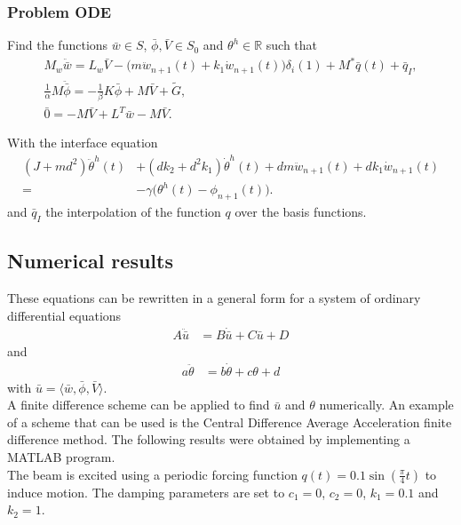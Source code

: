 \documentclass[../../main.tex]{subfiles}
\begin{document}
\subsubsection{Problem ODE}
Find the functions $\bar{w} \in S$, $\bar{\phi}, \bar{V} \in S_0$ and $\theta^h \in \mathbb{R}$ such that
\begin{align}
M_w\ddot{\bar{w}} = L_w\bar{V} -\big(m \ddot{w}_{n+1}(t) + k_1 \dot{w}_{n+1}(t) \big)\delta_i(1) + M^* \bar{q}(t) + \bar{q}_I,\\
\label{sys2}
\frac{1}{\alpha} M \ddot{\bar{\phi}} = -\frac{1}{\beta} K\bar{\phi} + M\bar{V} + \tilde{G},\\
\label{sys2.1}
\bar{0} = -M\bar{V} + L^T\bar{w} - M\bar{V}.
\end{align}

With the interface equation
\begin{align} \label{sys3} \nonumber
(J+md^2) \ddot \theta^h(t) &+ (d k_2+ d^2 k_1 ) \dot \theta^h(t)  + dm {\ddot w}_{n+1}(t) +  dk_1 {\dot w}_{n+1}(t)\\
  =&  -\gamma \big(\theta^h(t) - {\phi}_{n+1}(t)\big).
\end{align} and $\bar{q}_I$ the interpolation of the function $q$ over the basis functions.


\subsection{Numerical results}
These equations can be rewritten in a general form for a system of ordinary differential equations
\begin{align}
	A\ddot{\bar{u}} &= B\dot{\bar{u}} + C\bar{u} + D
\end{align}
and
\begin{align}
	a \ddot{\theta} & = b \dot{\theta} + c \theta + d
\end{align} with $\bar{u} = \langle \bar{w}, \bar{\phi}, \bar{V} \rangle$.\\

A finite difference scheme can be applied to find $\bar{u}$ and $\theta$ numerically. An example of a scheme that can be used is the Central Difference Average Acceleration finite difference method. The following results were obtained by implementing a MATLAB program.\\

The beam is excited using a periodic forcing function $q(t) = 0.1 \sin(\frac{\pi}{4}t)$ to induce motion. The damping parameters are set to $c_1 = 0$, $c_2 = 0$, $k_1 = 0.1$ and $k_2 = 1$.
\end{document}
